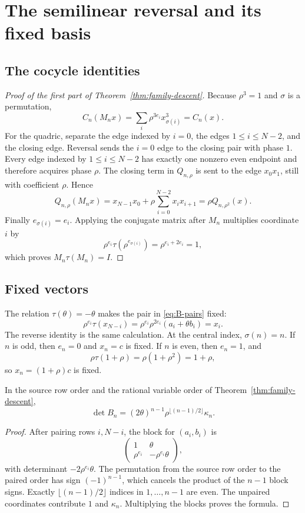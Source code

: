 \section{The semilinear reversal and its fixed basis}
\label{sec:explicit-descent}

\subsection{The cocycle identities}

\begin{proof}[Proof of the first part of
Theorem~\ref{thm:family-descent}]
Because \(\rho^3=1\) and \(\sigma\) is a permutation,
\[
C_n(M_nx)=\sum_i\rho^{3e_i}x_{\sigma(i)}^3=C_n(x).
\]
For the quadric, separate the edge indexed by \(i=0\), the edges
\(1\le i\le N-2\), and the closing edge.  Reversal sends the \(i=0\)
edge to the closing pair with phase \(1\).  Every edge indexed by
\(1\le i\le N-2\) has exactly one nonzero even endpoint and therefore
acquires phase \(\rho\).  The closing term in \(Q_{n,\rho}\) is sent to
the edge \(x_0x_1\), still with coefficient \(\rho\).  Hence
\[
Q_{n,\rho}(M_nx)
=x_{N-1}x_0+\rho\sum_{i=0}^{N-2}x_ix_{i+1}
=\rho Q_{n,\rho^2}(x).
\]
Finally \(e_{\sigma(i)}=e_i\).  Applying the conjugate matrix after
\(M_n\) multiplies coordinate \(i\) by
\[
\rho^{e_i}\tau(\rho^{e_{\sigma(i)}})
=\rho^{e_i+2e_i}=1,
\]
which proves \(M_n\tau(M_n)=I\).
\end{proof}

\subsection{Fixed vectors}

The relation \(\tau(\theta)=-\theta\) makes the pair in
\eqref{eq:B-pairs} fixed:
\[
\rho^{e_i}\tau(x_{N-i})
=\rho^{e_i}\rho^{2e_i}(a_i+\theta b_i)=x_i.
\]
The reverse identity is the same calculation.  At the central index,
\(\sigma(n)=n\).  If \(n\) is odd, then \(e_n=0\) and \(x_n=c\) is
fixed.  If \(n\) is even, then \(e_n=1\), and
\[
\rho\tau(1+\rho)=\rho(1+\rho^2)=1+\rho,
\]
so \(x_n=(1+\rho)c\) is fixed.

\begin{lemma}[Determinant]
\label{lem:determinant}
In the source row order and the rational variable order of
Theorem~\ref{thm:family-descent},
\[
\det B_n=(2\theta)^{n-1}
\rho^{\lfloor(n-1)/2\rfloor}\kappa_n.
\]
\end{lemma}

\begin{proof}
After pairing rows \(i,N-i\), the block for \((a_i,b_i)\) is
\[
\begin{pmatrix}
1&\theta\\
\rho^{e_i}&-\rho^{e_i}\theta
\end{pmatrix},
\]
with determinant \(-2\rho^{e_i}\theta\).  The permutation from the
source row order to the paired order has sign \((-1)^{n-1}\), which
cancels the product of the \(n-1\) block signs.  Exactly
\(\lfloor(n-1)/2\rfloor\) indices in \(1,\ldots,n-1\) are even.
The unpaired coordinates contribute \(1\) and \(\kappa_n\).  Multiplying
the blocks proves the formula.
\end{proof}

